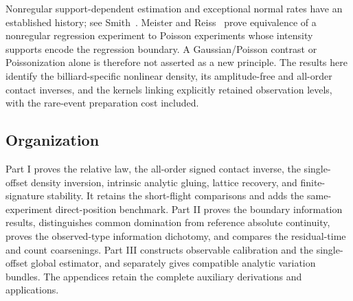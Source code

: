 Nonregular support-dependent estimation and exceptional normal rates have
an established history; see Smith~\cite{Smith1985}.  Meister and
Reiss~\cite{MeisterReiss} prove equivalence of a nonregular regression
experiment to Poisson experiments whose intensity supports encode the
regression boundary.  A Gaussian/Poisson contrast or Poissonization alone
is therefore not asserted as a new principle.  The results here identify
the billiard-specific nonlinear density, its amplitude-free and all-order
contact inverses, and the kernels linking explicitly retained observation
levels, with the rare-event preparation cost included.

\subsection{Organization}

Part I proves the relative law, the all-order signed contact inverse, the
single-offset density inversion, intrinsic analytic gluing, lattice recovery,
and finite-signature stability.  It retains the short-flight comparisons
and adds the same-experiment direct-position benchmark.  Part II proves the
boundary information results, distinguishes common domination from reference
absolute continuity, proves the observed-type information dichotomy,
and compares the residual-time and count coarsenings.
Part III constructs observable calibration and the single-offset global
estimator, and separately gives compatible analytic variation bundles.
The appendices retain the complete auxiliary derivations and applications.
